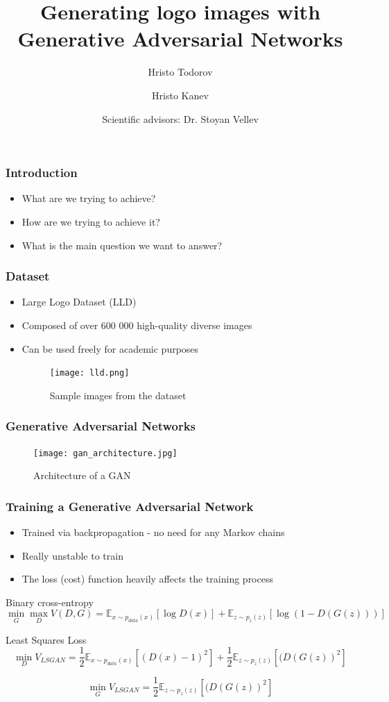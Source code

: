\documentclass{beamer}
\title[Generating logo images with GANs]{Generating logo images with \\ Generative Adversarial Networks}
\author[Todorov, Kanev, Vellev]{
 Hristo Todorov
 \and
 Hristo Kanev
 \\
 \and
 Scientific advisors: Dr. Stoyan Vellev
}
\begin{document}
\frame{\titlepage}

\begin{frame}
\frametitle{Introduction}
\begin{itemize}
\item What are we trying to achieve?
\item How are we trying to achieve it?
\item What is the main question we want to answer?
\end{itemize}
\end{frame}

\begin{frame}
\frametitle{Dataset}
\begin{itemize}
\item Large Logo Dataset (LLD)
\item Composed of over 600 000 high-quality diverse images
\item Can be used freely for academic purposes
\begin{figure}[ht]
    \centering
    \texttt{[image: lld.png]}
    \caption{Sample images from the dataset}
    \label{fig:dataset}
\end{figure}
\end{itemize}
\end{frame}

\begin{frame}
\frametitle{Generative Adversarial Networks}
\begin{figure}[ht]
    \texttt{[image: gan\_architecture.jpg]}
    \caption{Architecture of a GAN}
    \label{fig:gan}
\end{figure}

\end{frame}

\begin{frame}
\frametitle{Training a Generative Adversarial Network}
\begin{itemize}
\item Trained via backpropagation - no need for any Markov chains
\item Really unstable to train
\item The loss (cost) function heavily affects the training process
\end{itemize}
\begin{block}{Binary cross-entropy}
\begin{equation}
\min_G \max_D V(D, G) = \mathbb{E}_{x\sim p_{data}(x)}[\log D(x)]
    + \mathbb{E}_{z\sim p_z(z)}[\log(1 - D(G(z)))]
\end{equation}
\end{block}
\begin{block}{Least Squares Loss}
\begin{equation}
\min_D{V_{LSGAN}} = \frac{1}{2}\mathbb{E}_{x\sim p_{data}(x)}[(D(x) - 1)^2] + \frac{1}{2}\mathbb{E}_{z\sim p_{z}(z)}[(D(G(z))^2]
\end{equation}

\begin{equation}
\min_G{V_{LSGAN}} = \frac{1}{2}\mathbb{E}_{z\sim p_{z}(z)}[(D(G(z))^2]
\end{equation}
\end{block}
\end{frame}
\end{document}
